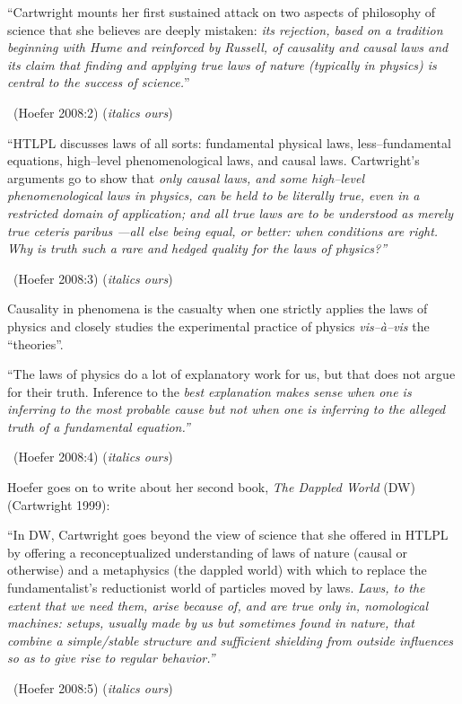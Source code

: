\begin{myquote}
“Cartwright mounts her first sustained attack on two aspects of philosophy of science that she believes are deeply mistaken: \textit{its rejection, based on a tradition beginning with Hume and reinforced by Russell, of causality and causal laws and its claim that finding and applying true laws of nature (typically in physics) is central to the success of science.}” 

~\hfill (Hoefer 2008:2) (\textit{italics ours})
\end{myquote}

\begin{myquote}
“HTLPL discusses laws of all sorts: fundamental physical laws, less–fundamental equations, high–level phenomenological laws, and causal laws. Cartwright’s arguments go to show that \textit{only causal laws, and some high–level phenomenological laws in physics, can be held to be literally true, even in a restricted domain of application; and all true laws are to be understood as merely true ceteris paribus —all else being equal, or better: when conditions are right. Why is truth such a rare and hedged quality for the laws of physics?”} 

~\hfill (Hoefer 2008:3) (\textit{italics ours})
\end{myquote}

Causality in phenomena is the casualty when one strictly applies the laws of physics and closely studies the experimental practice of physics \textit{vis–à–vis} the “theories”.

\begin{myquote}
“The laws of physics do a lot of explanatory work for us, but that does not argue for their truth. Inference to the \textit{best explanation makes sense when one is inferring to the most probable cause but not when one is inferring to the alleged truth of a fundamental equation.”} 

~\hfill (Hoefer 2008:4) (\textit{italics ours})
\end{myquote}

Hoefer goes on to write about her second book, \textit{The Dappled World} (DW)(Cartwright 1999):

\begin{myquote}
“In DW, Cartwright goes beyond the view of science that she offered in HTLPL by offering a reconceptualized understanding of laws of nature (causal or otherwise) and a metaphysics (the dappled world) with which to replace the fundamentalist’s reductionist world of particles moved by laws. \textit{Laws, to the extent that we need them, arise because of, and are true only in, nomological machines: setups, usually made by us but sometimes found in nature, that combine a simple/stable structure and sufficient shielding from outside influences so as to give rise to regular behavior.”} 

~\hfill (Hoefer 2008:5) (\textit{italics ours})
\end{myquote}

